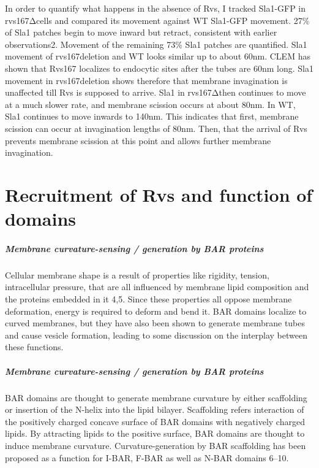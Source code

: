 	
In order to quantify what happens in the absence of Rvs, I tracked Sla1-GFP in rvs167Δcells and compared its movement against WT Sla1-GFP movement. 27\% of Sla1 patches begin to move inward but retract, consistent with earlier observations2. Movement of the remaining 73\% Sla1 patches are quantified. Sla1 movement of rvs167deletion and WT looks similar up to about 60nm. CLEM has shown that Rvs167 localizes to endocytic sites after the tubes are 60nm long. Sla1 movement in rvs167deletion shows therefore that membrane invagination is unaffected till Rvs is supposed to arrive. Sla1 in rvs167Δthen continues to move at a much slower rate, and membrane scission occurs at about 80nm. In WT, Sla1 continues to move inwards to 140nm. This indicates that first, membrane scission can occur at invagination lengths of 80nm. Then, that the arrival of Rvs prevents membrane scission at this point and allows further membrane invagination. 





\section{Recruitment of Rvs and function of domains} 

	\subparagraph{Membrane curvature-sensing / generation by BAR proteins }
Cellular membrane shape is a result of properties like rigidity, tension, intracellular pressure, that are all influenced by membrane lipid composition and the proteins embedded in it 4,5. Since these properties all oppose membrane deformation, energy is required to deform and bend it. BAR domains localize to curved membranes, but they have also been shown to generate membrane tubes and cause vesicle formation, leading to some discussion on the interplay between these functions. 

	\vspace{7mm}
			
				\subparagraph{Membrane curvature-sensing / generation by BAR proteins }
BAR domains are thought to generate membrane curvature by either scaffolding or insertion of the N-helix into the lipid bilayer. 
Scaffolding refers interaction of the positively charged concave surface of BAR domains with negatively charged lipids. By attracting lipids to the positive surface, BAR domains are thought to induce membrane curvature. Curvature-generation by BAR scaffolding has been proposed as a function for I-BAR, F-BAR as well as N-BAR domains 6–10. 
	\vspace{7mm}
	
